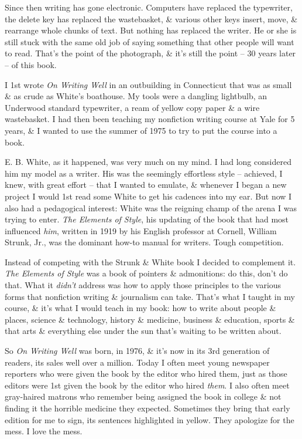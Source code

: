 \documentclass{article}
\begin{document}
Since then writing has gone electronic. Computers have replaced the typewriter, the delete key has replaced the wastebasket, \& various other keys insert, move, \& rearrange whole chunks of text. But nothing has replaced the writer. He or she is still stuck with the same old job of saying something that other people will want to read. That's the point of the photograph, \& it's still the point -- 30 years later -- of this book.

I 1st wrote \textit{On Writing Well} in an outbuilding in Connecticut that was as small \& as crude as White's boathouse. My tools were a dangling lightbulb, an Underwood standard typewriter, a ream of yellow copy paper \& a wire wastebasket. I had then been teaching my nonfiction writing course at Yale for 5 years, \& I wanted to use the summer of 1975 to try to put the course into a book.

E. B. White, as it happened, was very much on my mind. I had long considered him my model as a writer. His was the seemingly effortless style -- achieved, I knew, with great effort -- that I wanted to emulate, \& whenever I began a new project I would 1st read some White to get his cadences into my ear. But now I also had a pedagogical interest: White was the reigning champ of the arena I was trying to enter. \textit{The Elements of Style}, his updating of the book that had most influenced \textit{him}, written in 1919 by his English professor at Cornell, William Strunk, Jr., was the dominant how-to manual for writers. Tough competition.

Instead of competing with the Strunk \& White book I decided to complement it. \textit{The Elements of Style} was a book of pointers \& admonitions: do this, don't do that. What it \textit{didn't} address was how to apply those principles to the various forms that nonfiction writing \& journalism can take. That's what I taught in my course, \& it's what I would teach in my book: how to write about people \& places, science \& technology, history \& medicine, business \& education, sports \& that arts \& everything else under the sun that's waiting to be written about.

So \textit{On Writing Well} was born, in 1976, \& it's now in its 3rd generation of readers, its sales well over a million. Today I often meet young newspaper reporters who were given the book by the editor who hired them, just as those editors were 1st given the book by the editor who hired \textit{them}. I also often meet gray-haired matrons who remember being assigned the book in college \& not finding it the horrible medicine they expected. Sometimes they bring that early edition for me to sign, its sentences highlighted in yellow. They apologize for the mess. I love the mess.
\end{document}
